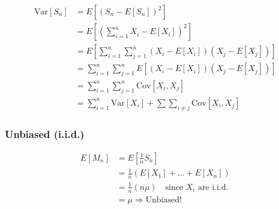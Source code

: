 \begin{derivation}
    \begin{align*}
        \text{Var}[S_n] &= E\left[(S_n - E[S_n])^2\right] \\
        &= E\left[\left(\sum_{i=1}^n X_i - E[X_i]\right)^2\right] \\
        &= E\left[\sum_{i=1}^n \sum_{j=1}^n (X_i - E[X_i])(X_j - E[X_j])\right] \\
        &= \sum_{i=1}^n \sum_{j=1}^n E\left[(X_i - E[X_i])(X_j - E[X_j])\right] \\
        &= \sum_{i=1}^n \sum_{j=1}^n \text{Cov}[X_i, X_j] \\
        &= \sum_{i=1}^n \text{Var}[X_i] + \sum \sum_{i \neq j} \text{Cov}[X_i, X_j]
    \end{align*}
\end{derivation}

\subsubsection{Unbiased (i.i.d.)}
\begin{derivation}
    \begin{align*}
        E[M_n] &= E\left[\frac{1}{n} S_n\right] \\
        &= \frac{1}{n} \left(E[X_1] + \dots + E[X_n]\right) \\
        &= \frac{1}{n} (n\mu) \quad \text{since $X_i$ are i.i.d.} \\
        &= \mu \Rightarrow \text{Unbiased!}
    \end{align*}
\end{derivation}

